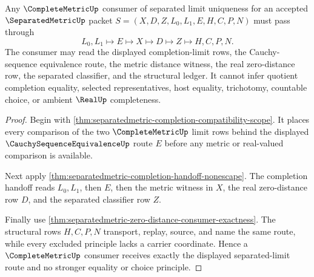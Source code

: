 \begin{theorem}
\label{thm:separatedmetric-complete-metric-consumer-exactness}
Any $\CompleteMetricUp$ consumer of separated limit uniqueness for an accepted $\SeparatedMetricUp$ packet $S=(X,D,Z,L_0,L_1,E,H,C,P,N)$ must pass through
$$
L_0,L_1 \longmapsto E \longmapsto X \longmapsto D \longmapsto Z \longmapsto H,C,P,N.
$$
The consumer may read the displayed completion-limit rows, the Cauchy-sequence equivalence route, the metric distance witness, the real zero-distance row, the separated classifier, and the structural ledger. It cannot infer quotient completion equality, selected representatives, host equality, trichotomy, countable choice, or ambient $\RealUp$ completeness.
\end{theorem}
\begin{proof}
Begin with \autoref{thm:separatedmetric-completion-compatibility-scope}. It places every comparison of the two $\CompleteMetricUp$ limit rows behind the displayed $\CauchySequenceEquivalenceUp$ route $E$ before any metric or real-valued comparison is available.

Next apply \autoref{thm:separatedmetric-completion-handoff-nonescape}. The completion handoff reads $L_0,L_1$, then $E$, then the metric witness in $X$, the real zero-distance row $D$, and the separated classifier row $Z$.

Finally use \autoref{thm:separatedmetric-zero-distance-consumer-exactness}. The structural rows $H,C,P,N$ transport, replay, source, and name the same route, while every excluded principle lacks a carrier coordinate. Hence a $\CompleteMetricUp$ consumer receives exactly the displayed separated-limit route and no stronger equality or choice principle.
\end{proof}

